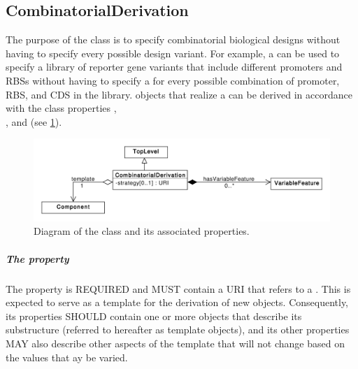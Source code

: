 \subsection{CombinatorialDerivation}
\label{sec:CombinatorialDerivation}

The purpose of the  class is to specify combinatorial biological designs without having to specify every possible design variant. For example, a  can be used to specify a library of reporter gene variants that include different promoters and RBSs without having to specify a  for every possible combination of promoter, RBS, and CDS in the library.  objects that realize a  can be derived in accordance with the class properties , \\
 , and  (see \ref{uml:combinatorial_derivation}).

\begin{figure}[ht]
\begin{center}
\includegraphics[scale=0.6]{uml/combinatorial_derivation}
\caption[]{Diagram of the  class and its associated properties.}
\label{uml:combinatorial_derivation}
\end{center}
\end{figure}

\subparagraph{The  property}\label{sec:template}

The  property is REQUIRED and MUST contain a URI that refers to a . 
This  is expected to serve as a template for the derivation of new  objects. 
Consequently, its  properties SHOULD contain one or more   objects that describe its substructure (referred to hereafter as template  objects), and its other properties MAY also describe other aspects of the template that will not change based on the values that ay be varied.

